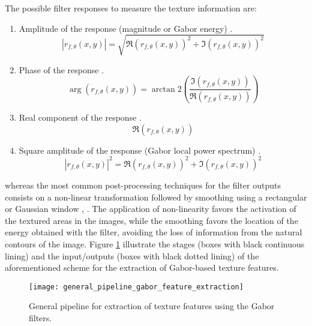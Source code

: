 The possible filter responses to measure the texture information are: 

\begin{enumerate}
    \item Amplitude of the response (magnitude or Gabor energy) \citep{Bovik.Clark.ea:TPAMI:1990}.
        \begin{equation}\label{eq:gabor_magnitude}
            |r_{f, \theta}(x,y)| = \sqrt{\Re{(r_{f, \theta}(x, y))}^2 + \Im{(r_{f, \theta}(x, y))}^2}
        \end{equation}
    \item Phase of the response \citep{Palm.Lehmann:MGV:2002}.
    \begin{equation}\label{eq:gabor_phase}
            \arg(r_{f, \theta}(x,y)) = \arctan2{\left(\frac{\Im{(r_{f, \theta}(x, y))}}{\Re{(r_{f, \theta}(x, y))}}\right)}
        \end{equation}
    \item Real component of the response \citep{Jain.Farrokhnia:IJPR:1991}.
    \begin{equation}\label{eq:gabor_real_part}
            \Re{(r_{f, \theta}(x, y))}
        \end{equation}
    \item Square amplitude of the response (Gabor local power spectrum) \citep{Grigorescu.Petkov.ea:TIP:2002}.
    \begin{equation}\label{eq:gabor_power}
            |r_{f, \theta}(x,y)|^2 = \Re{(r_{f, \theta}(x, y))}^2 + \Im{(r_{f, \theta}(x, y))}^2
        \end{equation}
\end{enumerate}
whereas the most common post-processing techniques for the filter outputs consists on a non-linear transformation followed by smoothing using a rectangular or Gaussian window \citep{Randen.Husoy:TPAMI:1999}, \citep{Clausi.EdJernigan:JPR:2000}. 
The application of non-linearity favors the activation of the textured areas in the images, while the smoothing favors the location of the energy obtained with the filter, avoiding the loss of information from the natural contours of the image. Figure \ref{fig:general_pipeline_gabor_feature_extraction} illustrate the stages (boxes with black continuous lining) and the input/outputs (boxes with black dotted lining) of the aforementioned scheme for the extraction of Gabor-based texture features.

\begin{figure}[!ht]
	\centering
	\texttt{[image: general\_pipeline\_gabor\_feature\_extraction]}
	\caption{General pipeline for extraction of texture features using the Gabor filters.}\label{fig:general_pipeline_gabor_feature_extraction}
\end{figure}


